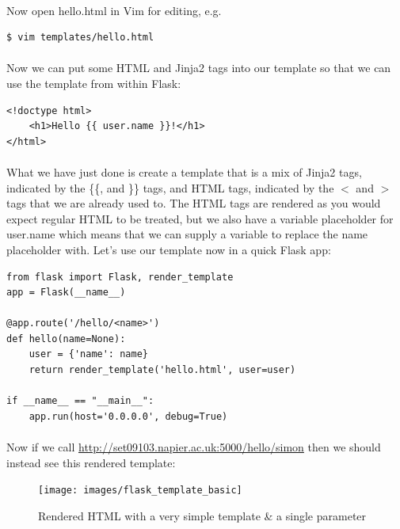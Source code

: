 \documentclass[12pt, a4paper, oneside]{book}
\begin{document}
{\paragraph{} Now open hello.html in Vim for editing, e.g.
\begin{lstlisting}[style=DOS]
$ vim templates/hello.html
\end{lstlisting}

\paragraph{} Now we can put some HTML and Jinja2 tags into our template so that we can use the template from within Flask:


\begin{lstlisting}
<!doctype html>
    <h1>Hello {{ user.name }}!</h1>
</html>
\end{lstlisting}

\paragraph{} What we have just done is create a template that is a mix of Jinja2 tags, indicated by the \{\{, and \}\} tags, and HTML tags, indicated by the $<$ and $>$ tags that we are already used to. The HTML tags are rendered as you would expect regular HTML to be treated, but we also have a variable placeholder for user.name which means that we can supply a variable to replace the name placeholder with. Let's use our template now in a quick Flask app:

\begin{lstlisting}
from flask import Flask, render_template
app = Flask(__name__)

@app.route('/hello/<name>')
def hello(name=None):
    user = {'name': name}
    return render_template('hello.html', user=user)

if __name__ == "__main__":
    app.run(host='0.0.0.0', debug=True)
\end{lstlisting}

\paragraph{} Now if we call \url{http://set09103.napier.ac.uk:5000/hello/simon} then we should instead see this rendered template:

\begin{figure}[H]
\centering
\texttt{[image: images/flask\_template\_basic]}
\caption{Rendered HTML with a very simple template \& a single parameter}
\label{fig:flask_template_basic}
\end{figure}


}
\end{document}
